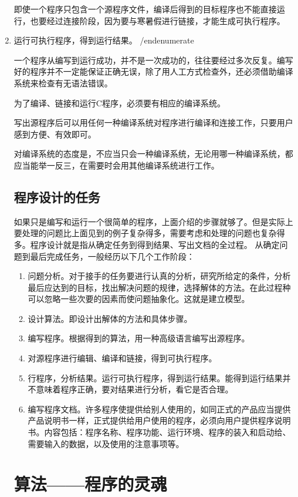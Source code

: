 \begin{lslisting}
\begin{enumerate}
 即使一个程序只包含一个源程序文件，编译后得到的目标程序也不能直接运行，也要经过连接阶段，因为要与寒暑假进行链接，才能生成可执行程序。
	\item 运行可执行程序，得到运行结果。
/end{enumerate}

 一个程序从编写到运行成功，并不是一次成功的，往往要经过多次反复。编写好的程序并不一定能保证正确无误，除了用人工方式检查外，还必须借助编译系统来检查有无语法错误。

 为了编译、链接和运行C程序，必须要有相应的编译系统。

 写出源程序后可以用任何一种编译系统对程序进行编译和连接工作，只要用户感到方便、有效即可。

 对编译系统的态度是，不应当只会一种编译系统，无论用哪一种编译系统，都应当能举一反三，在需要时会用其他编译系统进行工作。

\section{程序设计的任务}

如果只是编写和运行一个很简单的程序，上面介绍的步骤就够了。但是实际上要处理的问题比上面见到的例子复杂得多，需要考虑和处理的问题也复杂得多。程序设计就是指从确定任务到得到结果、写出文档的全过程。
从确定问题到最后完成任务，一般经历以下几个工作阶段：
\begin{enumerate}
	\item 问题分析。对于接手的任务要进行认真的分析，研究所给定的条件，分析最后应达到的目标，找出解决问题的规律，选择解体的方法。在此过程种可以忽略一些次要的因素而使问题抽象化。这就是建立模型。
	\item 设计算法。即设计出解体的方法和具体步骤。
	\item 编写程序。根据得到的算法，用一种高级语言编写出源程序。
	\item 对源程序进行编辑、编译和链接，得到可执行程序。
	\item 行程序，分析结果。运行可执行程序，得到运行结果。能得到运行结果并不意味着程序正确，要对结果进行分析，看它是否合理。
	\item 编写程序文档。许多程序使提供给别人使用的，如同正式的产品应当提供产品说明书一样，正式提供给用户使用的程序，必须向用户提供程序说明书。内容包括：程序名称、程序功能、运行环境、程序的装入和启动给、需要输入的数据，以及使用的注意事项等。
\end{enumerate}

\chapter{算法——程序的灵魂}


\end{enumerate}
\end{lslisting}
